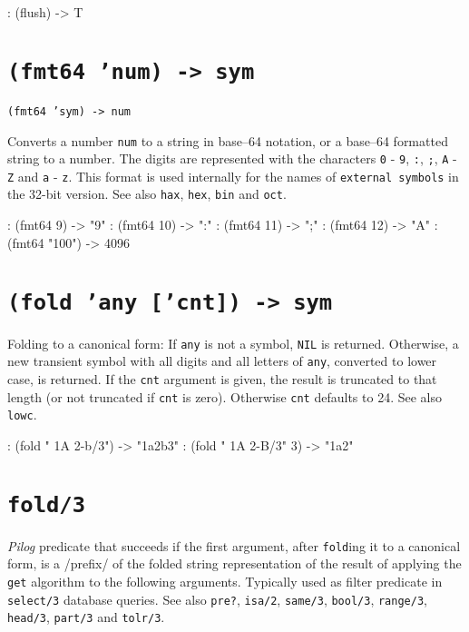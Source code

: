 \begin{wideverbatim}
: (flush)
-> T
\end{wideverbatim}

 
\section*{\texttt{(fmt64 'num) -> sym}}
\label{sec:func-ref-F-(fmt64 'num) -> sym}


\texttt{(fmt64 'sym) -> num}

Converts a number \texttt{num} to a string in base--64 notation, or a base--64
formatted string to a number. The digits are represented with the
characters \texttt{0} - \texttt{9}, \texttt{:}, \texttt{;}, \texttt{A} - \texttt{Z} and \texttt{a} - \texttt{z}. This format is
used internally for the names of \texttt{external symbols} in the 32-bit
version. See also \texttt{hax}, \texttt{hex}, \texttt{bin} and \texttt{oct}.


\begin{wideverbatim}
: (fmt64 9)
-> "9"
: (fmt64 10)
-> ":"
: (fmt64 11)
-> ";"
: (fmt64 12)
-> "A"
: (fmt64 "100")
-> 4096
\end{wideverbatim}

 
\section*{\texttt{(fold 'any ['cnt]) -> sym}}
\label{sec:func-ref-F-(fold 'any ['cnt]) -> sym}


Folding to a canonical form: If \texttt{any} is not a symbol, \texttt{NIL} is
returned. Otherwise, a new transient symbol with all digits and all
letters of \texttt{any}, converted to lower case, is returned. If the \texttt{cnt}
argument is given, the result is truncated to that length (or not
truncated if \texttt{cnt} is zero). Otherwise \texttt{cnt} defaults to 24. See also
\texttt{lowc}.


\begin{wideverbatim}
: (fold " 1A 2-b/3")
-> "1a2b3"
: (fold " 1A 2-B/3" 3)
-> "1a2"
\end{wideverbatim}

 
\section*{\texttt{fold/3}}
\label{sec:func-ref-F-fold/3}


\emph{Pilog} predicate that succeeds if the first
argument, after \texttt{fold}ing it to a canonical form, is a /prefix/
of the folded string representation of the result of applying the
\texttt{get} algorithm to the following arguments. Typically used as
filter predicate in \texttt{select/3} database queries. See also
\texttt{pre?}, \texttt{isa/2}, \texttt{same/3}, \texttt{bool/3},
\texttt{range/3}, \texttt{head/3}, \texttt{part/3} and
\texttt{tolr/3}.


